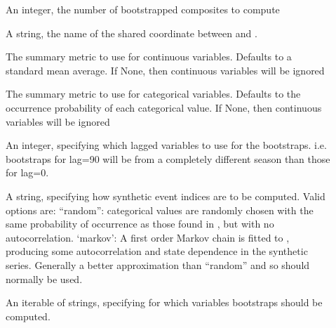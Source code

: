 \documentclass[letterpaper,10pt,english]{sphinxmanual}
\begin{document}
\begin{fulllineitems}
\begin{fulllineitems}
\sphinxAtStartPar
{}
\begin{description}
\item[{}] \leavevmode
\sphinxAtStartPar
An integer, the number of bootstrapped composites to compute

\end{description}

\sphinxAtStartPar
{}
\begin{description}
\item[{}] \leavevmode
\sphinxAtStartPar
A string, the name of the shared coordinate between  and .

\item[{}] \leavevmode
\sphinxAtStartPar
The summary metric to use for continuous variables. Defaults to a standard mean average. If None, then continuous variables will be ignored

\item[{}] \leavevmode
\sphinxAtStartPar
The summary metric to use for categorical variables. Defaults to the occurrence probability of each categorical value. If None, then continuous variables will be ignored

\item[{}] \leavevmode
\sphinxAtStartPar
An integer, specifying which lagged variables to use for the bootstraps. i.e. bootstraps for lag=90 will be from a completely different season than those for lag=0.

\item[{}] \leavevmode
\sphinxAtStartPar
A string, specifying how synthetic event indices are to be computed. Valid options are:
“random”: categorical values are randomly chosen with the same probability of occurrence as those found in , but with no autocorrelation.
‘markov’: A first order Markov chain is fitted to , producing some autocorrelation and state dependence in the synthetic series. Generally a better approximation than “random” and so should normally be used.

\item[{}] \leavevmode
\sphinxAtStartPar
An iterable of strings, specifying for which variables bootstraps should be computed.


\end{description}
\end{fulllineitems}
\end{fulllineitems}
\end{document}
